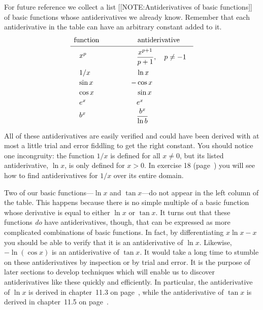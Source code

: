 For future reference we collect a list 
[[NOTE:Antiderivatives  of basic functions]]	
of basic functions whose antiderivatives we
already know.  Remember that each antiderivative in the table can have
an arbitrary constant added to it.
	\[
\begin{array}{ccc}
	\mbox{function} & \qquad &	\mbox{antiderivative} \\[2pt]
	\hline \\ [-9pt]
	\begin{array}{l}
		x^p 	\\ [12pt]
		1/x 	\\ [2pt]
		\sin{x} \\ [2pt]
		\cos{x} \\ [2pt]
		e^x	\\ [6pt]
		b^x	
	\end{array} 
	& & 
	\begin{array}{l} 
		\hphantom{-}\dfrac{x^{p+1}}{p+1}, \quad p \neq -1 \\[10pt]
		\hphantom{-}\ln{x}\\ [2pt]
			-\cos{x}\\ [2pt]
		\hphantom{-}\sin{x}\\ [2pt]
		\hphantom{-}e^x \\[2pt]
		\hphantom{-}\dfrac{b^x}{\ln{b}}
	\end{array}
	\end{array}
\]

All of these antiderivatives are easily verified and could have been
derived with at most a little trial and error fiddling to get the
right constant.  You should notice one incongruity: the function $1/x$
is defined for all $x\neq 0$, but its listed antiderivative, $\ln{x}$,
is only defined for $x>0$.  In exercise 18 (page~\pageref{log}) you
will see how to find antiderivatives for $1/x$ over its entire domain.

Two of our basic functions---$\ln{x}$ and $\tan{x}$---do not appear in
the left column of the table.  This happens because there is no simple
multiple of a basic function whose derivative is equal to either
$\ln{x}$ or $\tan{x}$.  It turns out that these functions {\em do\/}
have antiderivatives, though, that can be expressed as more
complicated combinations of basic functions.  In fact, by
differentiating $x \ln{x} - x$ you should be able to verify that it is
an antiderivative of $\ln{x}$.  Likewise, $- \ln(\cos{x})$ is an
antiderivative of $\tan{x}$.\label{tangent} It would take a long time
to stumble on these antiderivatives by inspection or by trial and
error.  It is the purpose of later sections to develop techniques
which will enable us to discover antiderivatives like these quickly
and efficiently.  In particular, the antiderivative of $\ln{x}$ is
derived in chapter~11.3 on page~\pageref{lnder}, while the
antiderivative of $\tan{x}$ is derived in chapter~11.5 on
page~\pageref{tander}.


